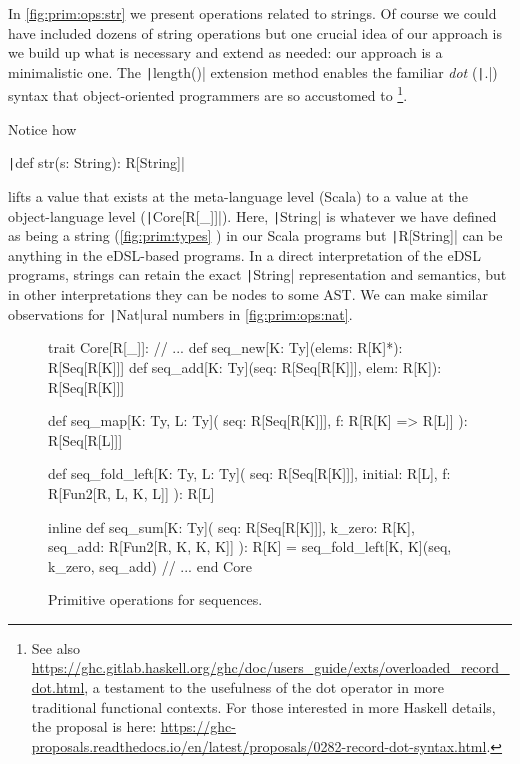 \documentclass[11pt]{article}
\renewcommand{\vref}[1]{\autoref{#1} \vpageref{#1}}{}
\newcommand{\ScalaI}[1]{\texttt|#1|}
\begin{document}
In \vref{fig:prim:ops:str} we present operations related to strings. Of 
course we could have included dozens of string operations but one crucial 
idea of our approach is we build up what is necessary and extend as needed: 
our approach is a minimalistic one. The \ScalaI{length()} extension method 
enables the familiar \textit{dot} (\ScalaI{.}) syntax that object-oriented 
programmers are so accustomed to%
\footnote{See also 
\href{https://ghc.gitlab.haskell.org/ghc/doc/users\_guide/exts/overloaded\_record\_dot.html}{https://ghc.gitlab.haskell.org/ghc/doc/users\_guide/exts/overloaded\_record\_dot.html},
 a testament to the usefulness of the dot operator in more traditional 
functional contexts. For those interested in more Haskell details, the 
proposal is here: 
\href{https://ghc-proposals.readthedocs.io/en/latest/proposals/0282-record-dot-syntax.html}{https://ghc-proposals.readthedocs.io/en/latest/proposals/0282-record-dot-syntax.html}.}.

Notice how 

\par\ScalaI{def str(s: String): R[String]}

\noindent lifts a value that exists at the meta-language level (Scala) to a 
value at the object-language level (\ScalaI{Core[R[_]]}). Here, 
\ScalaI{String} is whatever we have defined as being a string 
(\vref{fig:prim:types}) in our Scala programs but \ScalaI{R[String]} can be 
anything in the eDSL-based programs. In a direct interpretation of the eDSL 
programs, strings can retain the exact \ScalaI{String} representation and 
semantics, but in other interpretations they can be nodes to some AST. We can 
make similar observations for \ScalaI{Nat}ural numbers in 
\autoref{fig:prim:ops:nat}.

\begin{figure}[tb]
\begin{ScalaBlock}
trait Core[R[_]]:
  // ...
  def seq_new[K: Ty](elems: R[K]*): R[Seq[R[K]]]
  def seq_add[K: Ty](seq: R[Seq[R[K]]], elem: R[K]): R[Seq[R[K]]]
  
  def seq_map[K: Ty, L: Ty](
    seq: R[Seq[R[K]]],
    f: R[R[K] => R[L]]
  ): R[Seq[R[L]]]
  
  def seq_fold_left[K: Ty, L: Ty](
    seq: R[Seq[R[K]]],
    initial: R[L],
    f: R[Fun2[R, L, K, L]]
  ): R[L]
  
  inline def seq_sum[K: Ty](
    seq: R[Seq[R[K]]],
    k_zero: R[K],
    seq_add: R[Fun2[R, K, K, K]]
  ): R[K] =
    seq_fold_left[K, K](seq, k_zero, seq_add)
  // ...
end Core
\end{ScalaBlock}
\caption{Primitive operations for sequences.}
\label{fig:prim:ops:seq}
\hrulefill
\end{figure}
\end{document}
